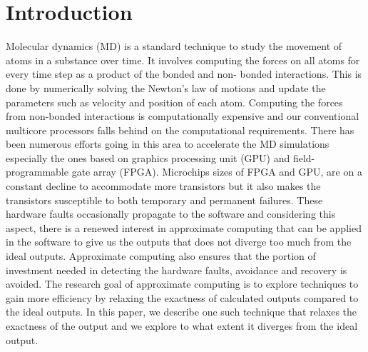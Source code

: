 \documentclass[aps,pre,twocolumn,showpacs,preprintnumbers,amsmath,amssymb]{revtex4-1}
\begin{document}
\date{\today}%


\begin{abstract}

\end{abstract}

\keywords{}%
\maketitle



\section{Introduction}
Molecular dynamics (MD) is a standard technique to study the movement of atoms in a substance over time. It involves computing the forces on all atoms for every time step as a product of the bonded and non- bonded interactions. This is done by numerically solving the Newton's law of motions and update the parameters such as velocity and position of each atom. Computing the forces from non-bonded interactions is computationally expensive and our conventional multicore processors falls behind on the computational requirements. There has been numerous efforts going in this area to accelerate the MD simulations especially the ones based on graphics processing unit (GPU) and field-programmable gate array (FPGA).   
Microchips sizes of FPGA and GPU, are on a constant decline to accommodate more transistors but it also makes the transistors susceptible to both temporary and permanent failures. These hardware faults occasionally propagate to the software and considering this aspect, there is a renewed interest in approximate computing that can be applied in the software to give us the outputs that does not diverge too much from the ideal outputs. Approximate computing also ensures that the portion of investment needed in detecting the hardware faults, avoidance and recovery is avoided. The research goal of approximate computing is to explore techniques to gain more efficiency by relaxing the exactness of calculated outputs compared to the ideal outputs. In this paper, we describe one such technique that relaxes the exactness of the output and we explore to what extent it diverges from the ideal output.
\end{document}
